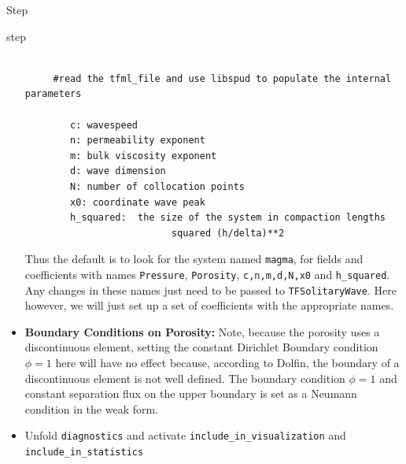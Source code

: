 \begin{steps}{Step}
\begin{steps}{step}
\begin{itemize}
\begin{lstlisting}[style=Python]
     
     #read the tfml_file and use libspud to populate the internal parameters

        c: wavespeed
        n: permeability exponent
        m: bulk viscosity exponent
        d: wave dimension
        N: number of collocation points
        x0: coordinate wave peak
        h_squared:  the size of the system in compaction lengths
                          squared (h/delta)**2

\end{lstlisting}
Thus the default is to look for the system named \texttt{magma}, for
fields and coefficients with names \texttt{Pressure},
\texttt{Porosity}, \texttt{c,n,m,d,N,x0} and \texttt{h\_squared}.  Any
changes in these names just need to be passed to
\texttt{TFSolitaryWave}.  Here however, we will just set up a set of
coefficients with the appropriate names.
\item \textbf{Boundary Conditions on Porosity:} Note, because the
  porosity uses a discontinuous element, setting the constant
  Dirichlet Boundary condition $\phi=1$ here will have no effect
  because, according to Dolfin, the boundary of a discontinuous
  element is not well defined.  The  boundary condition $\phi=1$ and 
  constant separation flux on the upper boundary is set  as a Neumann condition in
  the weak form.
  \item Unfold \texttt{diagnostics} and activate
      \texttt{include\_in\_visualization} and \texttt{include\_in\_statistics}

    \end{itemize}


\end{steps}
\end{steps}

